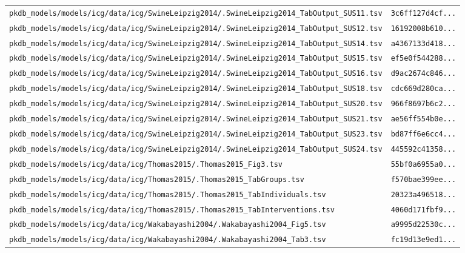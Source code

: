 \documentclass{article}
\begin{document}
\begin{longtable}{ll}
\texttt{pkdb\_models/models/icg/data/icg/SwineLeipzig2014/.SwineLeipzig2014\_TabOutput\_SUS11.tsv} & \texttt{3c6ff127d4cf...} \\
\texttt{pkdb\_models/models/icg/data/icg/SwineLeipzig2014/.SwineLeipzig2014\_TabOutput\_SUS12.tsv} & \texttt{16192008b610...} \\
\texttt{pkdb\_models/models/icg/data/icg/SwineLeipzig2014/.SwineLeipzig2014\_TabOutput\_SUS14.tsv} & \texttt{a4367133d418...} \\
\texttt{pkdb\_models/models/icg/data/icg/SwineLeipzig2014/.SwineLeipzig2014\_TabOutput\_SUS15.tsv} & \texttt{ef5e0f544288...} \\
\texttt{pkdb\_models/models/icg/data/icg/SwineLeipzig2014/.SwineLeipzig2014\_TabOutput\_SUS16.tsv} & \texttt{d9ac2674c846...} \\
\texttt{pkdb\_models/models/icg/data/icg/SwineLeipzig2014/.SwineLeipzig2014\_TabOutput\_SUS18.tsv} & \texttt{cdc669d280ca...} \\
\texttt{pkdb\_models/models/icg/data/icg/SwineLeipzig2014/.SwineLeipzig2014\_TabOutput\_SUS20.tsv} & \texttt{966f8697b6c2...} \\
\texttt{pkdb\_models/models/icg/data/icg/SwineLeipzig2014/.SwineLeipzig2014\_TabOutput\_SUS21.tsv} & \texttt{ae56ff554b0e...} \\
\texttt{pkdb\_models/models/icg/data/icg/SwineLeipzig2014/.SwineLeipzig2014\_TabOutput\_SUS23.tsv} & \texttt{bd87ff6e6cc4...} \\
\texttt{pkdb\_models/models/icg/data/icg/SwineLeipzig2014/.SwineLeipzig2014\_TabOutput\_SUS24.tsv} & \texttt{445592c41358...} \\
\texttt{pkdb\_models/models/icg/data/icg/Thomas2015/.Thomas2015\_Fig3.tsv} & \texttt{55bf0a6955a0...} \\
\texttt{pkdb\_models/models/icg/data/icg/Thomas2015/.Thomas2015\_TabGroups.tsv} & \texttt{f570bae399ee...} \\
\texttt{pkdb\_models/models/icg/data/icg/Thomas2015/.Thomas2015\_TabIndividuals.tsv} & \texttt{20323a496518...} \\
\texttt{pkdb\_models/models/icg/data/icg/Thomas2015/.Thomas2015\_TabInterventions.tsv} & \texttt{4060d171fbf9...} \\
\texttt{pkdb\_models/models/icg/data/icg/Wakabayashi2004/.Wakabayashi2004\_Fig5.tsv} & \texttt{a9995d22530c...} \\
\texttt{pkdb\_models/models/icg/data/icg/Wakabayashi2004/.Wakabayashi2004\_Tab3.tsv} & \texttt{fc19d13e9ed1...} \\

\end{longtable}
\end{document}

